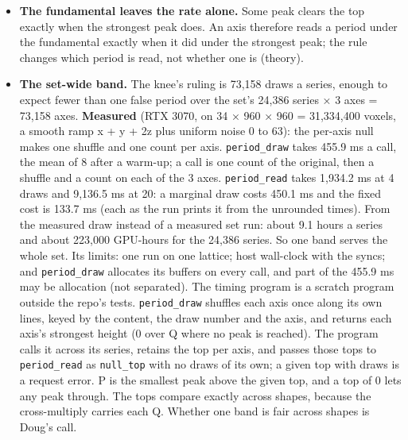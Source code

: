 \begin{itemize}
with each comparison a 128-bit cross-multiply. A period P also peaks at 2P and 3P with heights matching P's, and the strongest peak picked a multiple; the smallest peak above the top picks P. An empty band, where no draw reached a peak, or a given top of 0 lets any peak through, and the smallest peak is P. When none clears, P = 0 and the reported candidate is the strongest peak (the largest height, the smallest p on a tie). A lag that makes no peak at p and 2p is never a candidate. Nothing is rounded, and no constant is written in.
\item \textbf{The fundamental leaves the rate alone.} Some peak clears the top exactly when the strongest peak does. An axis therefore reads a period under the fundamental exactly when it did under the strongest peak; the rule changes which period is read, not whether one is (theory).
\item \textbf{The set-wide band.} The knee's ruling is 73,158 draws a series, enough to expect fewer than one false period over the set's 24,386 series × 3 axes = 73,158 axes. \textbf{Measured} (RTX 3070, on 34 × 960 × 960 = 31,334,400 voxels, a smooth ramp x + y + 2z plus uniform noise 0 to 63): the per-axis null makes one shuffle and one count per axis. \texttt{period\_\allowbreak{}draw} takes 455.9 ms a call, the mean of 8 after a warm-up; a call is one count of the original, then a shuffle and a count on each of the 3 axes. \texttt{period\_\allowbreak{}read} takes 1,934.2 ms at 4 draws and 9,136.5 ms at 20: a marginal draw costs 450.1 ms and the fixed cost is 133.7 ms (each as the run prints it from the unrounded times). From the measured draw instead of a measured set run: about 9.1 hours a series and about 223,000 GPU-hours for the 24,386 series. So one band serves the whole set. Its limits: one run on one lattice; host wall-clock with the syncs; and \texttt{period\_\allowbreak{}draw} allocates its buffers on every call, and part of the 455.9 ms may be allocation (not separated). The timing program is a scratch program outside the repo's tests. \texttt{period\_\allowbreak{}draw} shuffles each axis once along its own lines, keyed by the content, the draw number and the axis, and returns each axis's strongest height (0 over Q where no peak is reached). The program calls it across its series, retains the top per axis, and passes those tops to \texttt{period\_\allowbreak{}read} as \texttt{null\_\allowbreak{}top} with no draws of its own; a given top with draws is a request error. P is the smallest peak above the given top, and a top of 0 lets any peak through. The tops compare exactly across shapes, because the cross-multiply carries each Q. Whether one band is fair across shapes is Doug's call.

\end{itemize}
